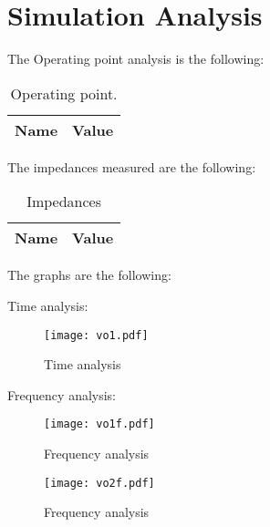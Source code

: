 \section{Simulation Analysis}
\label{sec:simulation}

The Operating point analysis is the following:

\begin{table}[H]
  \centering
  \begin{tabular}{|l|r|}
    \hline    
    {\bf Name} & {\bf Value } \\ \hline
    
  \end{tabular}
  \caption{Operating point.}
  \label{tab:op}
\end{table}

The impedances measured are the following:

\begin{table}[H]
  \centering
  \begin{tabular}{|l|r|}
    \hline    
    {\bf Name} & {\bf Value } \\ \hline
    
  \end{tabular}
  \caption{Impedances}
  \label{tab:op}
\end{table}

The graphs are the following:

Time analysis:
\begin{figure}[H] \centering
  \texttt{[image: vo1.pdf]}
  \caption{Time analysis}
  \label{fig:acm}
  \end{figure}

Frequency analysis:
  \begin{figure}[H] \centering
    \texttt{[image: vo1f.pdf]}
    \caption{Frequency analysis}
    \label{fig:acm}
    \end{figure}


    \begin{figure}[H] \centering
      \texttt{[image: vo2f.pdf]}
      \caption{Frequency analysis}
      \label{fig:acm}
      \end{figure}
